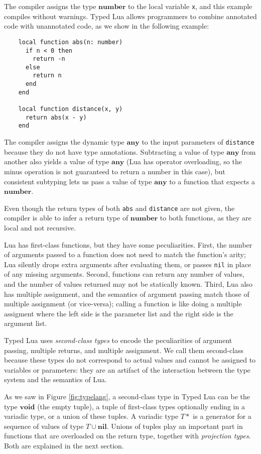 \documentclass[preprint]{sig-alternate}
\newcommand{\Any}{\mathbf{any}}
\newcommand{\Nil}{\mathbf{nil}}
\newcommand{\Number}{\mathbf{number}}
\newcommand{\Void}{\mathbf{void}}
\begin{document}
The compiler assigns the type $\Number$ to the local variable \texttt{x},
and this example compiles without warnings. Typed Lua allows
programmers to combine annotated code with
unannotated code, as we show in the following example:
\begin{verbatim}
    local function abs(n: number)
      if n < 0 then
        return -n
      else
        return n
      end
    end

    local function distance(x, y)
      return abs(x - y)
    end
\end{verbatim}

The compiler assigns the dynamic type $\Any$ to the input
parameters of \texttt{distance} because they do not have type annotations.
Subtracting a value of type $\Any$ from another also yields a value of
type $\Any$ (Lua has operator overloading, so the minus operation
is not guaranteed to return a number in this case), but
consistent subtyping lets us pass a value of type $\Any$ to a
function that expects a $\Number$. 

Even though the return types
of both {\tt abs} and {\tt distance} are not given, the compiler is able to
infer a return type of $\Number$ to both functions, as they are
local and not recursive.

Lua has first-class functions, but they have some peculiarities. First,
the number of arguments passed to a function does not need to
match the function's arity; Lua silently drops extra arguments after
evaluating them, or passes {\tt nil} in place of any missing arguments.
Second, functions can return any number of values, and the number
of values returned may not be statically known. Third, Lua also has
multiple assignment, and the semantics of argument passing match
those of multiple assignment (or vice-versa); calling a function is like
doing a multiple assigment where the left side is the parameter list
and the right side is the argument list. 

Typed Lua uses {\em second-class types} to encode the peculiarities
of argument passing, multiple returns, and multiple assignment. We call
them second-class because these types do not correspond to actual
values and cannot be assigned to variables or parameters: they are an
artifact of the interaction between the type system and the semantics of Lua.

As we saw in Figure \ref{fig:typelang}, a second-class type in
Typed Lua can be the type $\Void$ (the empty tuple),
a tuple of first-class types optionally ending in a variadic type,
or a union of these tuples. A variadic type $T*$ is a generator for a
sequence of values of type $T \cup \Nil$. Unions of tuples play
an important part in functions that are overloaded on the return type,
together with {\em projection types}. Both are explained in the next
section.
\end{document}
